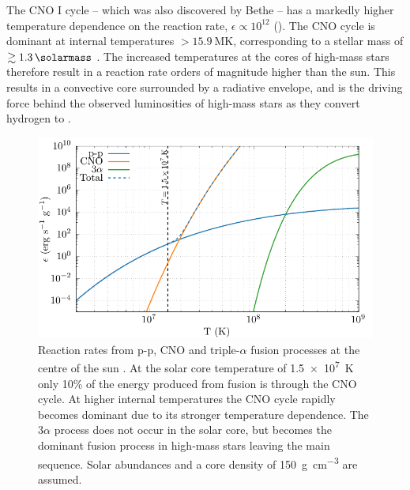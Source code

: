 \noindent
The CNO I cycle -- which was also discovered by Bethe \parencite{betheEnergyProductionStars1939} -- has a markedly higher temperature dependence on the reaction rate, $\epsilon \propto 10^{12}$
().
The CNO cycle is dominant at internal temperatures $>\SI{15.9}{\mega\kelvin}$, corresponding to a stellar mass of $\gtrsim \SI{1.3}{\solarmass}$ .
The increased temperatures at the cores of high-mass stars therefore result in a reaction rate orders of magnitude higher than the sun.
This results in a convective core surrounded by a radiative envelope, and is the driving force behind the observed luminosities of high-mass stars as they convert hydrogen to .

\begin{figure}[h]
  \centering
  \includegraphics{assets/reaction-rate/reaction-solar.pdf}
  \caption[Reaction rates at the center of the sun]{Reaction rates from p-p, CNO and triple-$\alpha$ fusion processes at the centre of the sun \parencite{harrisThermonuclearReactionRates1983}. At the solar core temperature of \SI{1.5e7}{\kelvin} only 10\% of the energy produced from fusion is through the CNO cycle. At higher internal temperatures the CNO cycle rapidly becomes dominant due to its stronger temperature dependence. The $3\alpha$ process does not occur in the solar core, but becomes the dominant fusion process in high-mass stars leaving the main sequence. Solar abundances and a core density of \SI{150}{\gram\per\centi\metre\cubed} are assumed.}
  \label{fig:fusionrates}
\end{figure}

